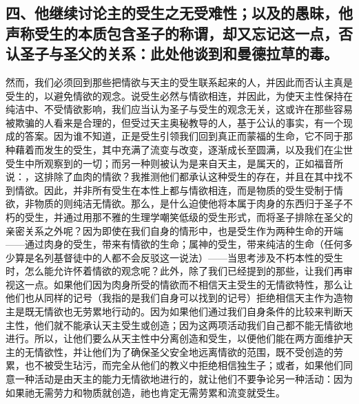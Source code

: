 
\subsection{四、他继续讨论主的受生之无受难性；以及的愚昧，他声称受生的本质包含圣子的称谓，却又忘记这一点，否认圣子与圣父的关系：此处他谈到和曼德拉草的毒。}

然而，我们必须回到那些把情欲与天主的受生联系起来的人，并因此而否认主真是受生的，以避免情欲的观念。说受生必然与情欲相连，并因此，为使天主性保持在纯洁中、不受情欲影响，我们应当认为圣子与受生的观念无关，这或许在那些容易被欺骗的人看来是合理的，但受过天主奥秘教导的人，基于公认的事实，有一个现成的答案。因为谁不知道，正是受生引领我们回到真正而蒙福的生命，它不同于那种藉着而发生的受生，其中充满了流变与改变，逐渐成长至圆满，以及我们在尘世受生中所观察到的一切；而另一种则被认为是来自天主，是属天的，正如福音所说：，这排除了血肉的情欲？我推测他们都承认这种受生的存在，并且在其中找不到情欲。因此，并非所有受生在本性上都与情欲相连，而是物质的受生受制于情欲，非物质的则纯洁无情欲。那么，是什么迫使他将本属于肉身的东西归于圣子不朽的受生，并通过用那不雅的生理学嘲笑低级的受生形式，而将圣子排除在圣父的亲密关系之外呢？因为即使在我们自身的情形中，也是受生作为两种生命的开端——通过肉身的受生，带来有情欲的生命；属神的受生，带来纯洁的生命（任何多少算是名列基督徒中的人都不会反驳这一说法）——当思考涉及不朽本性的受生时，怎么能允许怀着情欲的观念呢？此外，除了我们已经提到的那些，让我们再审视这一点。如果他们因为肉身所受的情欲而不相信天主受生的无情欲特性，那么让他们也从同样的记号（我指的是我们自身可以找到的记号）拒绝相信天主作为造物主是既无情欲也无劳累地行动的。因为如果他们通过我们自身条件的比较来判断天主性，他们就不能承认天主受生或创造；因为这两项活动我们自己都不能无情欲地进行。所以，让他们要么从天主性中分离创造和受生，以便他们能在两方面维护天主的无情欲性，并让他们为了确保圣父安全地远离情欲的范围，既不受创造的劳累，也不被受生玷污，而完全从他们的教义中拒绝相信独生子；或者，如果他们同意一种活动是由天主的能力无情欲地进行的，就让他们不要争论另一种活动：因为如果祂无需劳力和物质就创造，祂也肯定无需劳累和流变就受生。\par

